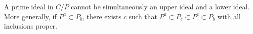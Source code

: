 A prime ideal in $C/P$ cannot be simultaneously an upper ideal and a lower ideal. More generally, if $P^a \subset P_b$, there exists $c$ such that $P^a \subset P_c \subset P^c \subset P_b$ with all inclusions proper.
